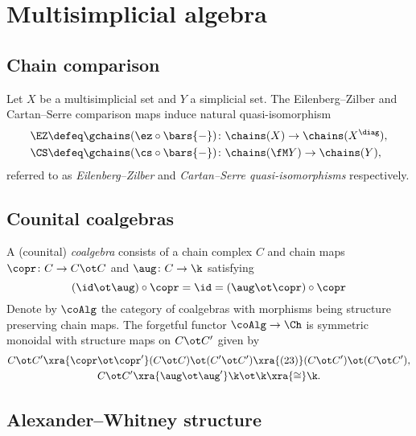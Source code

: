 
\section{Multisimplicial algebra}

\subsection{Chain comparison} \label{ss:comparison chain maps}

Let $X$ be a multisimplicial set and $Y$ a simplicial set.
The Eilenberg--Zilber and Cartan--Serre comparison maps induce natural quasi-isomorphism
\[
\begin{split}
	\EZ \defeq \gchains(\ez \circ \bars{-}) &\colon \chains(X) \to \chains(X^{\diag}), \\
	\CS \defeq \gchains(\cs \circ \bars{-}) &\colon \chains(\fM Y) \to \chains(Y), \\
\end{split}
\]
referred to as \textit{Eilenberg--Zilber} and \textit{Cartan--Serre quasi-isomorphisms} respectively.

\subsection{Counital coalgebras} \label{ss:coalgebras}

A (counital) \textit{coalgebra} consists of a chain complex $C$ and chain maps $\copr \colon C \to C \ot C$ and $\aug \colon C \to \k$ satisfying
\[
(\id \ot \aug) \circ \copr =
\id =
(\aug \ot \copr) \circ \copr
\]
Denote by $\coAlg$ the category of coalgebras with morphisms being structure preserving chain maps.
The forgetful functor $\coAlg \to \Ch$ is symmetric monoidal with structure maps on $C \ot C^\prime$ given by
\begin{gather*}
	C \ot C^\prime \xra{\copr \ot \copr^\prime}
	(C \ot C) \ot (C^\prime \ot C^\prime) \xra{(23)}
	(C \ot C^\prime) \ot (C \ot C^\prime), \\
	C \ot C^\prime \xra{\aug \ot \aug^\prime}
	\k \ot \k \xra{\cong} \k.
\end{gather*}

\subsection{Alexander--Whitney structure} \label{ss:alexander-whitney coalgebras}

